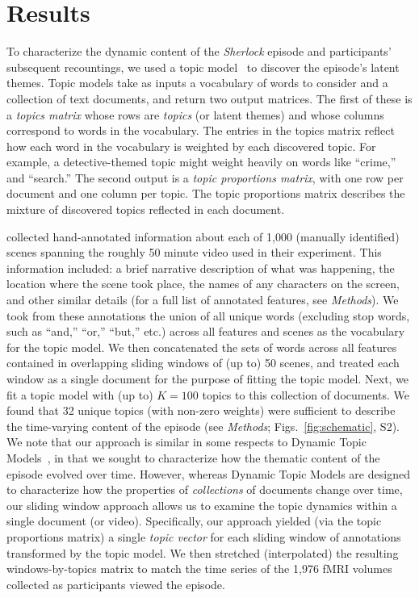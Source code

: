 \documentclass[10pt]{article}
\newcommand{\topics}{S2}
\begin{document}
\section*{Results}
To characterize the dynamic content of the \textit{Sherlock} episode and participants' subsequent recountings, we used a topic model~\citep{BleiEtal03} to discover the episode's latent themes.  Topic models take as inputs a vocabulary of words to consider and a collection of text documents, and return two output matrices.  The first of these is a \textit{topics matrix} whose rows are \textit{topics} (or latent themes) and whose columns correspond to words in the vocabulary. The entries in the topics matrix reflect how each word in the vocabulary is weighted by each discovered topic.  For example, a detective-themed topic might weight heavily on words like ``crime,'' and ``search.''  The second output is a \textit{topic proportions matrix}, with one row per document and one column per topic.  The topic proportions matrix describes the mixture of discovered topics reflected in each document.

\cite{ChenEtal17} collected hand-annotated information about each of 1,000 (manually identified) scenes spanning the roughly 50 minute video used in their experiment.  This information included: a brief narrative description of what was happening, the location where the scene took place, the names of any characters on the screen, and other similar details (for a full list of annotated features, see \textit{Methods}).  We took from these annotations the union of all unique words (excluding stop words, such as ``and,'' ``or,'' ``but,'' etc.) across all features and scenes as the vocabulary for the topic model.  We then concatenated the sets of words across all features contained in overlapping sliding windows of (up to) 50 scenes, and treated each window as a single document for the purpose of fitting the topic model.  Next, we fit a topic model with (up to) $K = 100$ topics to this collection of documents.  We found that 32 unique topics (with non-zero weights) were sufficient to describe the time-varying content of the episode (see \textit{Methods}; Figs.~\ref{fig:schematic}, \topics).  We note that our approach is similar in some respects to Dynamic Topic Models~\citep{BleiLaff06}, in that we sought to characterize how the thematic content of the episode evolved over time.  However, whereas Dynamic Topic Models are designed to characterize how the properties of \textit{collections} of documents change over time, our sliding window approach allows us to examine the topic dynamics within a single document (or video).  Specifically, our approach yielded (via the topic proportions matrix) a single \textit{topic vector} for each sliding window of annotations transformed by the topic model.  We then stretched (interpolated) the resulting windows-by-topics matrix to match the time series of the 1,976 fMRI volumes collected as participants viewed the episode.
\end{document}
